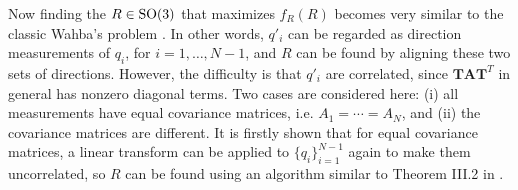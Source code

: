 Now finding the $R\in\mathrm{SO}(3)$ that maximizes $f_R(R)$ becomes very similar to the classic Wahba's problem \cite{markley1988attitude,shuster1981three}.
In other words, $q'_i$ can be regarded as direction measurements of $q_i$, for $i=1,\ldots,N-1$, and $R$ can be found by aligning these two sets of directions.
However, the difficulty is that $q'_i$ are correlated, since $\mathbf{T}\mathbf{A}\mathbf{T}^T$ in general has nonzero diagonal terms.
Two cases are considered here: (i) all measurements have equal covariance matrices, i.e. $A_1 = \cdots = A_N$, and (ii) the covariance matrices are different.
It is firstly shown that for equal covariance matrices, a linear transform can be applied to $\{q_i\}_{i=1}^{N-1}$ again to make them uncorrelated, so $R$ can be found using an algorithm similar to Theorem III.2 in \cite{lee2018bayesian}.

